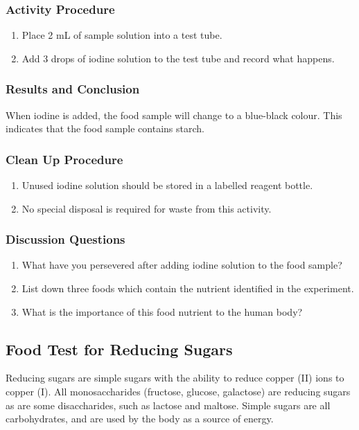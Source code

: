 \subsubsection*{Activity Procedure}
\begin{enumerate}
\item{Place 2 mL of sample solution into a test tube.}
\item{Add 3 drops of iodine solution to the test tube and record what happens.}
\end{enumerate}

\subsubsection*{Results and Conclusion}
When iodine is added, the food sample will change to a blue-black colour. This indicates that the food sample contains starch.

\subsubsection*{Clean Up Procedure}
\begin{enumerate}
\item{Unused iodine solution should be stored in a labelled reagent bottle.}
\item{No special disposal is required for waste from this activity.}
\end{enumerate}

\subsubsection*{Discussion Questions}
\begin{enumerate}
\item{What have you persevered after adding iodine solution to the food sample?}
\item{List down three foods which contain the nutrient identified in the experiment.}
\item{What is the importance of this food nutrient to the human body?}
\end{enumerate}

\subsection{Food Test for Reducing Sugars}
Reducing sugars are simple sugars with the ability to reduce copper (II) ions to copper (I). All monosaccharides (fructose, glucose, galactose) are reducing sugars as are some disaccharides, such as lactose and maltose. Simple sugars are all carbohydrates, and are used by the body as a source of energy.

